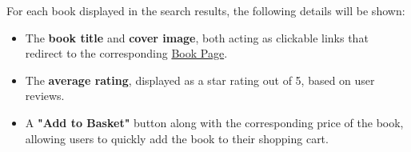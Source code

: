 For each book displayed in the search results, the following details will be shown:
\begin{itemize}
    \item The \textbf{book title} and \textbf{cover image}, both acting as clickable links that redirect to the corresponding \hyperref[sec:book]{Book Page}.
    \item The \textbf{average rating}, displayed as a star rating out of 5, based on user reviews.
    \item A \textbf{"Add to Basket"} button along with the corresponding price of the book, allowing users to quickly add the book to their shopping cart.
\end{itemize}